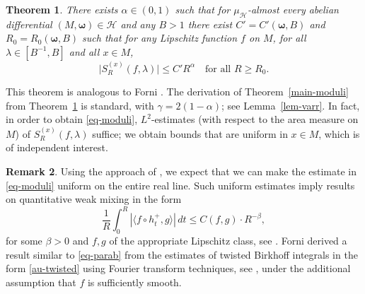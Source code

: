 \documentclass[JEP,XML,SOM,Unicode]{cedram}
\let\mathcal\mathscr
\theoremstyle{plain}
\newtheorem{theorem}{Theorem}[section]
\theoremstyle{definition}
\newtheorem{remark}[theorem]{Remark}
\newcommand{\omb}{\boldsymbol \omega}
\let\lam\lambda
\let\gam\gamma
\newcommand{\HH}{\mathcal{H}}
\begin{document}
\begin{theorem} \label{th-twisted}
There exists $\alpha\in (0,1)$ such that for $\mu_\HH$-almost every abelian differential $(M, \omb)\in \HH$ and any $B>1$ there exist $C'=C'(\omb,B)$ and $R_0 = R_0(\omb,B)$ such that for any Lipschitz function $f$ on $M$, for all $\lam\in [B^{-1},B]$ and all $x\in M$,
\begin{equation} \label{au-twisted}
\bigl|S_R^{(x)}(f,\lam)\bigr| \le C' R^\alpha\quad\text{for all }R\ge R_0.
\end{equation}
\end{theorem}

This theorem is analogous to Forni \cite[Th.\,1.6]{Forni2}.
The derivation of Theorem~\ref{main-moduli} from Theorem~\ref{th-twisted} is standard, with $\gam = 2(1-\alpha)$; see Lemma~\ref{lem-varr}. In fact, in order to obtain \eqref{eq-moduli}, $L^2$-estimates (with respect to
the area measure on $M$) of $S_R^{(x)}(f,\lam)$ suffice; we obtain bounds that are uniform in $x\in M$, which is of independent interest.

\begin{remark}
Using the approach of \cite{BuSo18b}, we expect that we can make the estimate in \eqref{eq-moduli} uniform
on the entire real line.
Such uniform estimates imply results on quantitative weak mixing in the form
\begin{equation} \label{eq-parab}
\frac{1}{R} \int_0^R \left|\langle f\circ h_t^+, g\rangle\right|\,dt \le C(f,g) \cdot R^{-\beta},
\end{equation}
for some $\beta>0$ and $f,g$ of the appropriate Lipschitz class, see \cite[Th.\,1.1]{BuSo18b}.
Forni \cite[Cor.\,1.8]{Forni2} derived a result similar to \eqref{eq-parab} from the estimates of twisted Birkhoff integrals in the form \eqref{au-twisted} using Fourier transform techniques, see
\cite[Lem.\,9.3]{Forni2}, under the additional assumption that $f$ is sufficiently smooth.
\end{remark}
\end{document}
